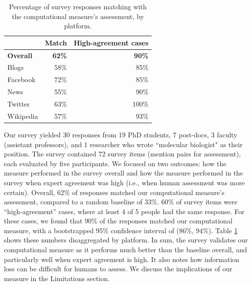 \documentclass[letterpaper]{article} %
\begin{document}
\begin{table}[t]
    \centering
    \begin{tabular}{@{}l|r|r@{}}
     & \textbf{Match} & \textbf{High-agreement cases} \\ \hline
    \textbf{Overall} & \textbf{62\%} & \textbf{90\%} \\ \hline
    {Blogs} & 58\% & 85\%\\ %
    {Facebook} & 72\% & 85\% \\ %
    {News} & 55\% & 90\% \\ %
    {Twitter} & 63\% & 100\% \\ %
    {Wikipedia} & 57\% & 93\% %
    \end{tabular}
    \caption{Percentage of survey responses matching with the computational measure's assessment, by platform.}
    \label{tab:survey_items_platforms}
\end{table}


Our survey yielded 30 responses from 19 PhD students, 7 post-docs, 3 faculty (assistant professors), and 1 researcher who wrote ``molecular biologist" as their position. The survey contained 72 survey items (mention pairs for assessment), each evaluated by five participants. We focused on two outcomes: how the measure performed in the survey overall and how the measure performed in the survey when expert agreement was high (i.e., when human assessment was more certain).
Overall, 62\% of responses matched our computational measure's assessment, compared to a random baseline of 33\%. 60\% of survey items were ``high-agreement'' cases, where at least 4 of 5 people had the same response. For these cases, we found that 90\% of the responses matched our computational measure, with a bootstrapped 95\% confidence interval of (86\%, 94\%). Table \ref{tab:survey_items_platforms} shows these numbers disaggregated by platform.
In sum, the survey validates our computational measure as it performs much better than the baseline overall, and particularly well when expert agreement is high. It also notes how information loss can be difficult for humans to assess. We discuss the implications of our measure in the Limitations section.
\end{document}
